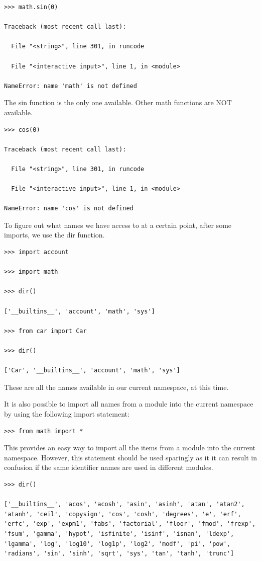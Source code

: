 \documentclass{article}
\begin{document}
\begin{lstlisting}
>>> math.sin(0)

Traceback (most recent call last):

  File "<string>", line 301, in runcode

  File "<interactive input>", line 1, in <module>

NameError: name 'math' is not defined
\end{lstlisting}

The sin function is the only one available.  Other math functions are NOT available.

\begin{lstlisting}
>>> cos(0)

Traceback (most recent call last):

  File "<string>", line 301, in runcode

  File "<interactive input>", line 1, in <module>

NameError: name 'cos' is not defined
\end{lstlisting}

To figure out what names we have access to at a certain point, after some imports, we use the dir function.

\begin{lstlisting}
>>> import account

>>> import math

>>> dir()

['__builtins__', 'account', 'math', 'sys']

>>> from car import Car

>>> dir()

['Car', '__builtins__', 'account', 'math', 'sys']
\end{lstlisting}

These are all the names available in our current namespace, at this time.

It is also possible to import all names from a module into the current namespace by using the following import statement:

\begin{lstlisting}
>>> from math import *
\end{lstlisting}

This provides an easy way to import all the items from a module into the current namespace.  However, this statement should be used sparingly as it it can result in confusion if the same identifier names are used in different modules.

\begin{lstlisting}
>>> dir()

['__builtins__', 'acos', 'acosh', 'asin', 'asinh', 'atan', 'atan2', 'atanh', 'ceil', 'copysign', 'cos', 'cosh', 'degrees', 'e', 'erf', 'erfc', 'exp', 'expm1', 'fabs', 'factorial', 'floor', 'fmod', 'frexp', 'fsum', 'gamma', 'hypot', 'isfinite', 'isinf', 'isnan', 'ldexp', 'lgamma', 'log', 'log10', 'log1p', 'log2', 'modf', 'pi', 'pow', 'radians', 'sin', 'sinh', 'sqrt', 'sys', 'tan', 'tanh', 'trunc']
\end{lstlisting}
\end{document}

